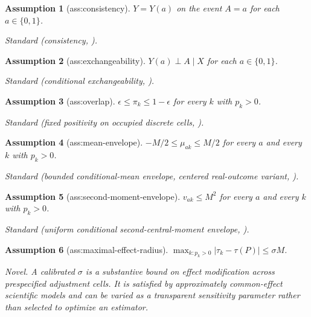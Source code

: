 \documentclass{article}
\newtheorem{assumption}{Assumption}
\begin{document}
\begin{assumption}[ass:consistency]\label{ass:consistency}
\(Y=Y(a)\) on the event \(A=a\) for each \(a\in\{0,1\}\).
\par\smallskip\noindent\emph{Standard} (consistency, \cite{HernanRobins2020}).
\end{assumption}

\begin{assumption}[ass:exchangeability]\label{ass:exchangeability}
\(Y(a)\perp A\mid X\) for each \(a\in\{0,1\}\).
\par\smallskip\noindent\emph{Standard} (conditional exchangeability, \cite{HernanRobins2020}).
\end{assumption}

\begin{assumption}[ass:overlap]\label{ass:overlap}
\(\epsilon\le\pi_k\le1-\epsilon\) for every \(k\) with \(p_k>0\).
\par\smallskip\noindent\emph{Standard} (fixed positivity on occupied discrete cells, \cite{ZengBalakrishnanHanKennedy2024}).
\end{assumption}

\begin{assumption}[ass:mean-envelope]\label{ass:mean-envelope}
\(-M/2\le\mu_{ak}\le M/2\) for every \(a\) and every \(k\) with \(p_k>0\).
\par\smallskip\noindent\emph{Standard} (bounded conditional-mean envelope, centered real-outcome variant, \cite{ZengBalakrishnanHanKennedy2024}).
\end{assumption}

\begin{assumption}[ass:second-moment-envelope]\label{ass:second-moment-envelope}
\(v_{ak}\le M^2\) for every \(a\) and every \(k\) with \(p_k>0\).
\par\smallskip\noindent\emph{Standard} (uniform conditional second-central-moment envelope, \cite{ZengBalakrishnanHanKennedy2024}).
\end{assumption}

\begin{assumption}[ass:maximal-effect-radius]\label{ass:maximal-effect-radius}
\(\max_{k:p_k>0}|\tau_k-\tau(P)|\le\sigma M\).
\par\smallskip\noindent\emph{Novel.} A calibrated \(\sigma\) is a substantive bound on effect modification across prespecified adjustment cells. It is satisfied by approximately common-effect scientific models and can be varied as a transparent sensitivity parameter rather than selected to optimize an estimator.
\end{assumption}
\end{document}
